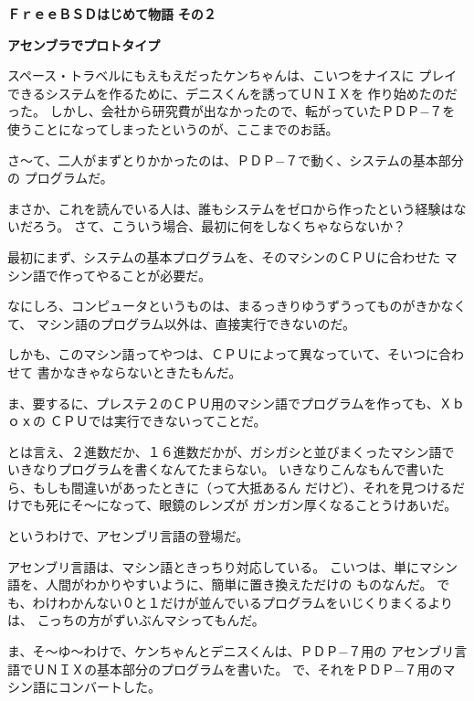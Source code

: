 \documentclass[12pt]{jarticle}
\begin{document}
\setcounter{page}{41}
\setlength{\baselineskip}{5.7mm}
\noindent
\textbf{\Huge ＦｒｅｅＢＳＤはじめて物語}
\hspace{1cm}
\textbf{\LARGE その２}

\bigskip

\textbf{\large アセンブラでプロトタイプ}

\bigskip

スペース・トラベルにもえもえだったケンちゃんは、こいつをナイスに
プレイできるシステムを作るために、デニスくんを誘ってＵＮＩＸを
作り始めたのだった。
しかし、会社から研究費が出なかったので、転がっていたＰＤＰ−７を
使うことになってしまったというのが、ここまでのお話。

\bigskip

さ〜て、二人がまずとりかかったのは、ＰＤＰ−７で動く、システムの基本部分の
プログラムだ。

まさか、これを読んでいる人は、誰もシステムをゼロから作ったという経験はないだろう。
さて、こういう場合、最初に何をしなくちゃならないか？

最初にまず、システムの基本プログラムを、そのマシンのＣＰＵに合わせた
マシン語で作ってやることが必要だ。

\bigskip

なにしろ、コンピュータというものは、まるっきりゆうずうってものがきかなくて、
マシン語のプログラム以外は、直接実行できないのだ。

しかも、このマシン語ってやつは、ＣＰＵによって異なっていて、そいつに合わせて
書かなきゃならないときたもんだ。

\bigskip

ま、要するに、プレステ２のＣＰＵ用のマシン語でプログラムを作っても、Ｘｂｏｘの
ＣＰＵでは実行できないってことだ。

\bigskip

とは言え、２進数だか、１６進数だかが、ガシガシと並びまくったマシン語で
いきなりプログラムを書くなんてたまらない。
いきなりこんなもんで書いたら、もしも間違いがあったときに（って大抵あるん
だけど）、それを見つけるだけでも死にそ〜になって、眼鏡のレンズが
ガンガン厚くなることうけあいだ。

というわけで、アセンブリ言語の登場だ。

アセンブリ言語は、マシン語ときっちり対応している。
こいつは、単にマシン語を、人間がわかりやすいように、簡単に置き換えただけの
ものなんだ。
でも、わけわかんない０と１だけが並んでいるプログラムをいじくりまくるよりは、
こっちの方がずいぶんマシってもんだ。


ま、そ〜ゆ〜わけで、ケンちゃんとデニスくんは、ＰＤＰ−７用の
アセンブリ言語でＵＮＩＸの基本部分のプログラムを書いた。
で、それをＰＤＰ−７用のマシン語にコンバートした。
\end{document}
